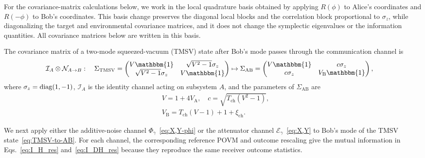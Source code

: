 \documentclass[%
final, 
superscriptaddress,
 amsmath,amssymb,amsfonts,
 aps,
 pra,
 longbibliography,
]{revtex4-2}
\newcommand{\diag}{\mathop{\rm diag}\nolimits}
\newcommand{\ind}[1]{\mathrm{#1}}
\begin{document}
For the covariance-matrix calculations below, we work in the local quadrature basis obtained by applying $R(\phi)$ to Alice's coordinates and $R(-\phi)$ to Bob's coordinates. This basis change preserves the diagonal local blocks and the correlation block proportional to $\sigma_z$, while diagonalizing the target and environmental covariance matrices, and it does not change the symplectic eigenvalues or the information quantities. All covariance matrices below are written in this basis.

The covariance matrix of a two-mode squeezed-vacuum (TMSV) state after Bob's mode passes through the communication channel is~\cite{Laudenbach:aqt:2018}
\begin{align}
  \label{eq:TMSV-to-AB}
  \mathcal{I}_A&\otimes \mathcal{N}_{A\to B}:
\quad
    \Sigma_{\ind{TMSV}}
  =
  \begin{pmatrix}
        V\mathbbm{1}&\sqrt{V^2-1}\sigma_z\\
        \sqrt{V^2-1}\sigma_z&V\mathbbm{1}
    \end{pmatrix}
  \mapsto
    \Sigma_{\ind{AB}}
    =
    \begin{pmatrix}
        V\mathbbm{1}&c\sigma_z\\
        c\sigma_z&V_{\ind{B}}\mathbbm{1}
    \end{pmatrix},
\end{align}
where $\sigma_z=\diag(1,-1)$, $\mathcal{I}_A$ is the identity channel acting on subsystem $A$, and the parameters of $\Sigma_{\ind{AB}}$ are
\begin{align}
  \label{eq:V-c}
  &
    V=1+4V_{\ind{A}},
    \quad c=\sqrt{T_{\ind{ch}}(V^2-1)},
  \\
  &
  \label{eq:V_B}
    V_{\ind{B}}=T_{\ind{ch}}(V-1)+1+\xi_{\ind{ch}}.
\end{align}


We next apply either the additive-noise channel $\Phi_{\gamma}$~\eqref{eq:X,Y-phi} or the attenuator channel $\mathcal{E}_{\gamma}$~\eqref{eq:X,Y} to Bob's mode of the TMSV state~\eqref{eq:TMSV-to-AB}. For each channel, the corresponding reference POVM and outcome rescaling give the mutual information in Eqs.~\eqref{eq:I_H_res} and~\eqref{eq:I_DH_res} because they reproduce the same receiver outcome statistics.
\end{document}
